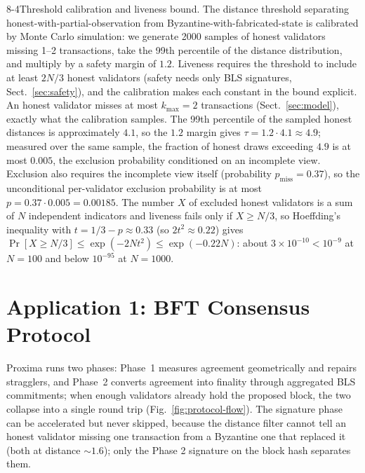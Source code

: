 \documentclass[runningheads]{llncs}
\makeatletter
\renewcommand\paragraph{\@startsection{paragraph}{4}{\z@}%
  {8\p@ \@plus 2\p@ \@minus 2\p@}{-4\p@}{\normalfont\normalsize\bfseries\boldmath}}
\makeatother
\begin{document}
\paragraph{Threshold calibration and liveness bound.}
\label{sec:calibration}
\label{sec:liveness-bound}
The distance threshold separating honest-with-partial-observation from Byzantine-with-fabricated-state is calibrated by Monte Carlo simulation: we generate 2000 samples of honest validators missing 1--2 transactions, take the 99th percentile of the distance distribution, and multiply by a safety margin of $1.2$. Liveness requires the threshold to include at least $2N/3$ honest validators (safety needs only BLS signatures, Sect.~\ref{sec:safety}), and the calibration makes each constant in the bound explicit. An honest validator misses at most $k_{\max}=2$ transactions (Sect.~\ref{sec:model}), exactly what the calibration samples. The 99th percentile of the sampled honest distances is approximately $4.1$, so the $1.2$ margin gives $\tau = 1.2 \cdot 4.1 \approx 4.9$; measured over the same sample, the fraction of honest draws exceeding $4.9$ is at most $0.005$, the exclusion probability conditioned on an incomplete view. Exclusion also requires the incomplete view itself (probability $p_{\mathrm{miss}} = 0.37$), so the unconditional per-validator exclusion probability is at most $p = 0.37 \cdot 0.005 = 0.00185$. The number $X$ of excluded honest validators is a sum of $N$ independent indicators and liveness fails only if $X \ge N/3$, so Hoeffding's inequality with $t = 1/3 - p \approx 0.33$ (so $2t^2 \approx 0.22$) gives $\Pr[X \ge N/3] \le \exp(-2Nt^2) \le \exp(-0.22 N)$: about $3 \times 10^{-10} < 10^{-9}$ at $N{=}100$ and below $10^{-95}$ at $N{=}1000$.

\section{Application 1: BFT Consensus Protocol}
\label{sec:protocol}

Proxima runs two phases: Phase~1 measures agreement geometrically and repairs stragglers, and Phase~2 converts agreement into finality through aggregated BLS commitments; when enough validators already hold the proposed block, the two collapse into a single round trip (Fig.~\ref{fig:protocol-flow}). The signature phase can be accelerated but never skipped, because the distance filter cannot tell an honest validator missing one transaction from a Byzantine one that replaced it (both at distance $\sim 1.6$); only the Phase 2 signature on the block hash separates them.
\end{document}
